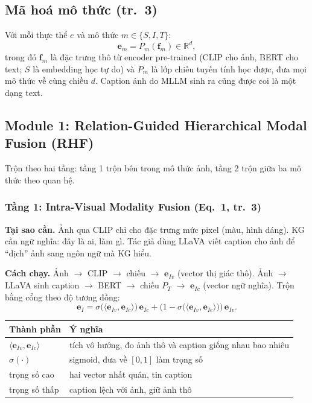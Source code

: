 \documentclass[11pt,a4paper]{article}
\begin{document}
\subsection{Mã hoá mô thức (tr.~3)}

Với mỗi thực thể $e$ và mô thức $m \in \{S, I, T\}$:
\begin{equation*}
\mathbf{e}_m = P_m(\mathbf{f}_m) \in \mathbb{R}^d,
\end{equation*}
trong đó $\mathbf{f}_m$ là đặc trưng thô từ encoder pre-trained (CLIP cho ảnh, BERT cho text; $S$ là embedding học tự do) và $P_m$ là lớp chiếu tuyến tính học được, đưa mọi mô thức về cùng chiều $d$. Caption ảnh do MLLM sinh ra cũng được coi là một dạng text.

\subsection{Module 1: Relation-Guided Hierarchical Modal Fusion (RHF)}

Trộn theo hai tầng: tầng 1 trộn bên trong mô thức ảnh, tầng 2 trộn giữa ba mô thức theo quan hệ.

\subsubsection{Tầng 1: Intra-Visual Modality Fusion (Eq.~1, tr.~3)}

\textbf{Tại sao cần.} Ảnh qua CLIP chỉ cho đặc trưng mức pixel (màu, hình dáng). KG cần ngữ nghĩa: đây là ai, làm gì. Tác giả dùng LLaVA viết caption cho ảnh để ``dịch'' ảnh sang ngôn ngữ mà KG hiểu.

\textbf{Cách chạy.} Ảnh $\rightarrow$ CLIP $\rightarrow$ chiếu $\rightarrow$ $\mathbf{e}_{Iv}$ (vector thị giác thô). Ảnh $\rightarrow$ LLaVA sinh caption $\rightarrow$ BERT $\rightarrow$ chiếu $P_T$ $\rightarrow$ $\mathbf{e}_{Ic}$ (vector ngữ nghĩa). Trộn bằng cổng theo độ tương đồng:
\begin{equation}
\mathbf{e}_I = \sigma\big(\langle \mathbf{e}_{Iv}, \mathbf{e}_{Ic}\rangle\big)\,\mathbf{e}_{Ic} + \Big(1 - \sigma\big(\langle \mathbf{e}_{Iv}, \mathbf{e}_{Ic}\rangle\big)\Big)\,\mathbf{e}_{Iv}.
\label{eq:intra}
\end{equation}

\begin{table}[H]
\centering\small
\begin{tabular}{@{}ll@{}}
\toprule
Thành phần & Ý nghĩa\\
\midrule
$\langle \mathbf{e}_{Iv}, \mathbf{e}_{Ic}\rangle$ & tích vô hướng, đo ảnh thô và caption giống nhau bao nhiêu\\
$\sigma(\cdot)$ & sigmoid, đưa về $[0,1]$ làm trọng số\\
trọng số cao & hai vector nhất quán, tin caption\\
trọng số thấp & caption lệch với ảnh, giữ ảnh thô\\
\bottomrule
\end{tabular}
\end{table}
\end{document}
